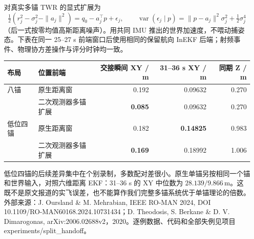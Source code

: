 \documentclass[UTF8,a4paper,fontset=windows]{ctexart}
\newcommand{\unit}[1]{\,\mathrm{#1}}
\begin{document}
对真实多锚 TWR 的显式扩展为
\[
 \tfrac12(r_j^2-\sigma_j^2-\|a_j\|^2)=q_0-a_j^\top p+\epsilon_j,\qquad
 \operatorname{var}(\epsilon_j\mid p)=\|p-a_j\|^2\sigma_j^2+\tfrac12\sigma_j^4
\]
（后一式按零均值高斯距离噪声）。用共同 IMU 推出的世界加速度，不喂动捕姿态。下表在同一 25--27 s 前端窗口后使用相同的保留航向 InEKF 后端；射频事件、物理协方差操作与评分时钟均一致。
\begin{center}\small\begin{tabular}{llrrr}\toprule
布局 & 位置前端 & 交接瞬间 XY / m & 31--36 s XY / m & 同期 Z / m\\\midrule
八锚 & 原生距离窗 &0.192&0.09632&0.270\\
     & 二次观测器多锚扩展 &\textbf{0.085}&0.09632&0.270\\
低位四锚 & 原生距离窗 &0.182&\textbf{0.14825}&0.983\\
         & 二次观测器多锚扩展 &\textbf{0.169}&0.18992&1.006\\\bottomrule\end{tabular}\end{center}
低位四锚的后续差异集中在个别录制，多数配对差很小。原生单锚另按相同一个锚和世界输入，对照六维距离 EKF：31--36 s 的 XY 中位数为 \(28.139/9.866\unit m\)。这既不是原文报道的实飞误差，也不能算作我们完整多锚系统优于单锚理论的倍数。
\vfill{\footnotesize\color{muted} 外部来源：J. Oursland \& M. Mehrabian, IEEE RO-MAN 2024, DOI 10.1109/RO-MAN60168.2024.10731434；D. Theodosis, S. Berkane \& D. V. Dimarogonas, arXiv:2006.02688v2，2020。逐例数据、代码和全部失例见项目 experiments/split\_handoff。}
\end{document}
